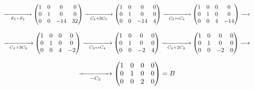 \documentclass[twoside]{report}
\theoremstyle{mystyle}
\begin{document}
$$
\underset{F_{3} - F_{2}}{\xrightarrow{\hspace{15mm}}}
\begin{pmatrix}
1 & 0 & 0 & 0\\
0 & 1 & 0 & 0\\
0 & 0 & -14 & 32 
\end{pmatrix}
\underset{C_{4} + 2C_{3}}{\xrightarrow{\hspace{15mm}}}
\begin{pmatrix}
1 & 0 & 0 & 0\\
0 & 1 & 0 & 0\\
0 & 0 & -14 & 4
\end{pmatrix}
\underset{C_{3} \leftrightarrow C_{4}}{\xrightarrow{\hspace{15mm}}}
\begin{pmatrix}
1 & 0 & 0 & 0\\
0 & 1 & 0 & 0\\
0 & 0 & 4 & -14
\end{pmatrix}
\longrightarrow
$$

\vspace{3mm}

$$
\underset{C_{4} + 3C_{3}}{\xrightarrow{\hspace{15mm}}}
\begin{pmatrix}
1 & 0 & 0 & 0\\
0 & 1 & 0 & 0\\
0 & 0 & 4 & -2
\end{pmatrix}
\underset{C_{3} \leftrightarrow C_{4}}{\xrightarrow{\hspace{15mm}}}
\begin{pmatrix}
1 & 0 & 0 & 0\\
0 & 1 & 0 & 0\\
0 & 0 & -2 & 4
\end{pmatrix}
\underset{C_{4} + 2C_{3}}{\xrightarrow{\hspace{15mm}}}
\begin{pmatrix}
1 & 0 & 0 & 0\\
0 & 1 & 0 & 0\\
0 & 0 & -2 & 0
\end{pmatrix}
\longrightarrow
$$

\vspace{3mm}

$$
\underset{-C_{3}}{\xrightarrow{\hspace{15mm}}}
\begin{pmatrix}
1 & 0 & 0 & 0\\
0 & 1 & 0 & 0\\
0 & 0 & 2 & 0
\end{pmatrix}
= B
$$
\end{document}

